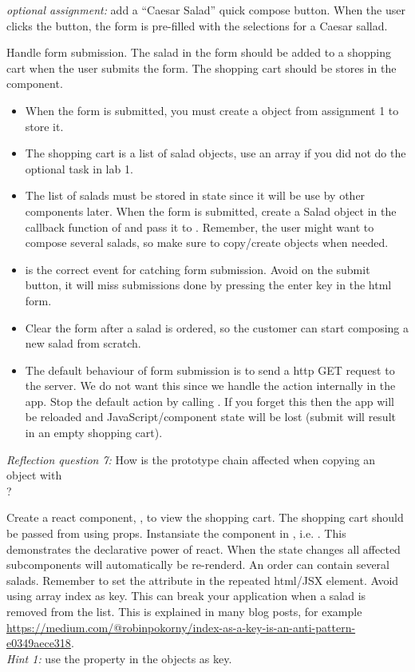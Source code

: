 \documentclass[fleqn, article, a4paper]{memoir}
\begin{document}
\begin{Assignments}
\item \emph{optional assignment:} add a ``Caesar Salad'' quick compose button. When the user clicks the button, the form is pre-filled with the selections for a Caesar sallad.


\item Handle form submission. The salad in the form should be added to a shopping cart when the user submits the form. The shopping cart should be stores in the  component.
\begin{itemize}
  \item When the form is submitted, you must create a  object from assignment 1 to store it.
  \item The shopping cart is a list of salad objects, use an array if you did not do the optional task in lab 1.
  \item The list of salads must be stored in  state since it will be use by other components later. When the form is submitted, create a Salad object in the callback function of  and pass it to . Remember, the user might want to compose several salads, so make sure to copy/create objects when needed.
  \item {} is the correct event for catching form submission. Avoid  on the submit button, it will miss submissions done by pressing the enter key in the html form.
  \item Clear the form after a salad is ordered, so the customer can start composing a new salad from scratch.
  \item The default behaviour of form submission is to send a http GET request to the server. We do not want this since we handle the action internally in the app. Stop the default action by calling . If you forget this then the app will be reloaded and JavaScript/component state will be lost (submit will result in an empty shopping cart).
\end{itemize}
\emph{Reflection question 7:} How is the prototype chain affected when copying an object with \\?

\item Create a react component, , to view the shopping cart. The shopping cart should be passed from  using props. Instansiate the  component in , i.e. . This demonstrates the declarative power of react. When the state changes all affected subcomponents will automatically be re-renderd.
\newline
\newline
An order can contain several salads. Remember to set the  attribute in the repeated html/JSX element. Avoid using array index as key. This can break your application when a salad is removed from the list. This is explained in many blog posts, for example \url{https://medium.com/@robinpokorny/index-as-a-key-is-an-anti-pattern-e0349aece318}.
\\ \noindent \emph{Hint 1:} use the  property in the  objects as key.


\end{Assignments}
\end{document}
